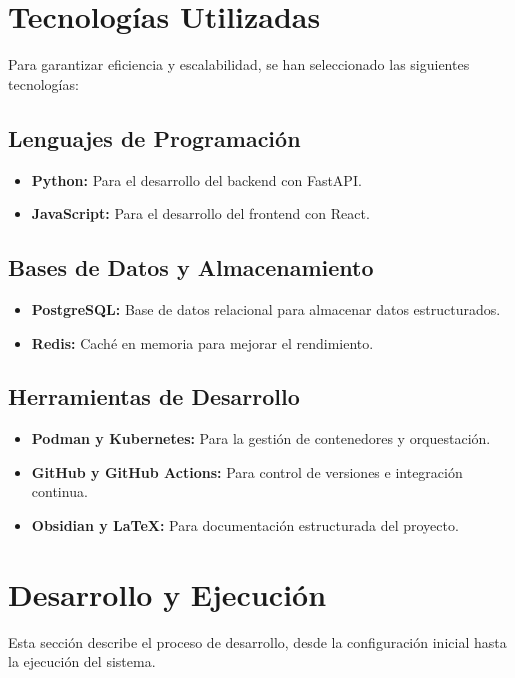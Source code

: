 \section{Tecnologías Utilizadas}

Para garantizar eficiencia y escalabilidad, se han seleccionado las siguientes tecnologías:

\subsection{Lenguajes de Programación}
\begin{itemize}
	\item \textbf{Python:} Para el desarrollo del backend con FastAPI.
	\item \textbf{JavaScript:} Para el desarrollo del frontend con React.
\end{itemize}

\subsection{Bases de Datos y Almacenamiento}
\begin{itemize}
	\item \textbf{PostgreSQL:} Base de datos relacional para almacenar datos estructurados.
	\item \textbf{Redis:} Caché en memoria para mejorar el rendimiento.
\end{itemize}

\subsection{Herramientas de Desarrollo}
\begin{itemize}
	\item \textbf{Podman y Kubernetes:} Para la gestión de contenedores y orquestación.
	\item \textbf{GitHub y GitHub Actions:} Para control de versiones e integración continua.
	\item \textbf{Obsidian y LaTeX:} Para documentación estructurada del proyecto.
\end{itemize}



\section{Desarrollo y Ejecución}

Esta sección describe el proceso de desarrollo, desde la configuración inicial hasta la ejecución del sistema.

